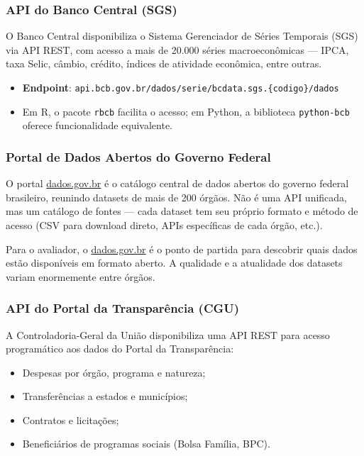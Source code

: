 \subsubsection{API do Banco Central (SGS)}

O Banco Central disponibiliza o Sistema Gerenciador de Séries Temporais (SGS) via API REST, com acesso a mais de 20.000 séries macroeconômicas --- IPCA, taxa Selic, câmbio, crédito, índices de atividade econômica, entre outras.

\begin{itemize}
  \item \textbf{Endpoint}: \nolinkurl{api.bcb.gov.br/dados/serie/bcdata.sgs.{codigo}/dados}
  \item Em R, o pacote \texttt{rbcb} facilita o acesso; em Python, a biblioteca \texttt{python-bcb} oferece funcionalidade equivalente.
\end{itemize}

\subsubsection{Portal de Dados Abertos do Governo Federal}

O portal \url{dados.gov.br} é o catálogo central de dados abertos do governo federal brasileiro, reunindo datasets de mais de 200 órgãos. Não é uma API unificada, mas um catálogo de fontes --- cada dataset tem seu próprio formato e método de acesso (CSV para download direto, APIs específicas de cada órgão, etc.).

Para o avaliador, o \url{dados.gov.br} é o ponto de partida para descobrir quais dados estão disponíveis em formato aberto. A qualidade e a atualidade dos datasets variam enormemente entre órgãos.

\subsubsection{API do Portal da Transparência (CGU)}

A Controladoria-Geral da União disponibiliza uma API REST para acesso programático aos dados do Portal da Transparência:

\begin{itemize}
  \item Despesas por órgão, programa e natureza;
  \item Transferências a estados e municípios;
  \item Contratos e licitações;
  \item Beneficiários de programas sociais (Bolsa Família, BPC).
\end{itemize}

